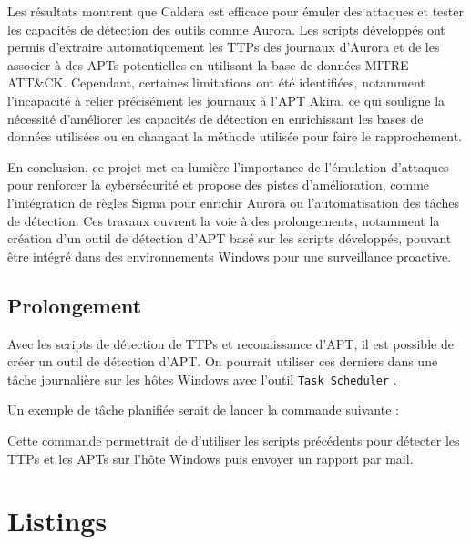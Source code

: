 \documentclass[12pt,letterpaper]{article}
\begin{document}
\bigskip

Les résultats montrent que Caldera est efficace pour émuler des attaques et tester les capacités de détection des outils comme Aurora.
Les scripts développés ont permis d'extraire automatiquement les TTPs des journaux d'Aurora et de les associer à des APTs potentielles en utilisant la base de données MITRE ATT\&CK.
Cependant, certaines limitations ont été identifiées, notamment l'incapacité à relier précisément les journaux à l'APT Akira, ce qui souligne la nécessité d'améliorer les capacités de détection en enrichissant les bases de données utilisées ou en changant la méthode utilisée pour faire le rapprochement.

\bigskip

En conclusion, ce projet met en lumière l'importance de l'émulation d'attaques pour renforcer la cybersécurité et propose des pistes d'amélioration, comme l'intégration de règles Sigma pour enrichir Aurora ou l'automatisation des tâches de détection.
Ces travaux ouvrent la voie à des prolongements, notamment la création d'un outil de détection d'APT basé sur les scripts développés, pouvant être intégré dans des environnements Windows pour une surveillance proactive.

\subsection{Prolongement}

Avec les scripts de détection de TTPs et reconaissance d'APT, il est possible de créer un outil de détection d'APT.
On pourrait utiliser ces derniers dans une tâche journalière sur les hôtes Windows avec l'outil \verb|Task Scheduler| \cite{mensHowCreatePowerShell2023}.

Un exemple de tâche planifiée serait de lancer la commande suivante :


Cette commande permettrait de d'utiliser les scripts précédents pour détecter les TTPs et les APTs sur l'hôte Windows puis envoyer un rapport par mail.

\newpage
\section{Listings}




\newpage

\end{document}

